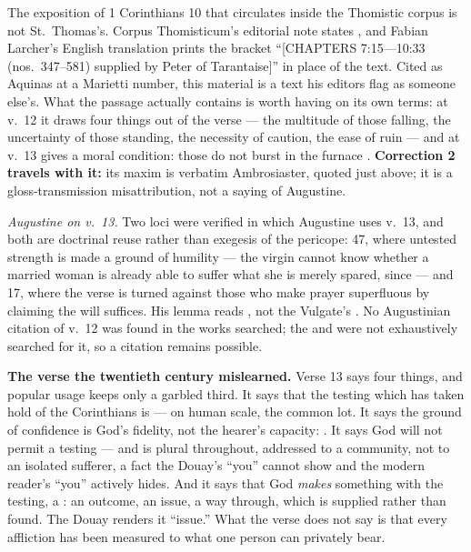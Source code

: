 \begin{witnessnote}
The exposition of 1 Corinthians 10 that circulates inside the Thomistic corpus
is not St.\ Thomas's. Corpus Thomisticum's editorial note states , and Fabian Larcher's English
translation prints the bracket ``[CHAPTERS 7:15---10:33 (nos.\ 347--581)
supplied by Peter of Tarantaise]'' in place of the text. Cited as Aquinas at
a Marietti number, this material is a text his editors flag as someone
else's. What the passage actually contains
is worth having on its own terms: at v.~12 it draws four things out of the
verse --- the multitude of those falling, the uncertainty of those standing,
the necessity of caution, the ease of ruin --- and at v.~13 gives
 a moral condition: those do not burst in the furnace
. \textbf{Correction 2 travels with
it:} its maxim 
is verbatim Ambrosiaster, quoted just above; it is a gloss-transmission
misattribution, not a saying of Augustine.
\end{witnessnote}

\textit{Augustine on v.~13.} Two loci were verified in which
Augustine uses v.~13, and both are doctrinal reuse rather than exegesis of the
pericope:  47, where untested strength is made a
ground of humility --- the virgin cannot know whether a married woman is
already able to suffer what she is merely spared, since  --- and  17, where the
verse is turned against those who make prayer superfluous by claiming the will
suffices. His lemma reads , not the Vulgate's
. No Augustinian citation of v.~12 was found in the works
searched; the  and  were not exhaustively
searched for it, so a citation remains possible.

\textbf{The verse the twentieth century mislearned.} Verse 13 says four
things, and popular usage keeps only a garbled third. It says that the
testing which has taken hold of the Corinthians is  --- on
human scale, the common lot. It says the ground of confidence is God's
fidelity, not the hearer's capacity: . It says
God will not permit a testing  --- and
 is plural throughout, addressed to a community, not to an
isolated sufferer, a fact the Douay's ``you'' cannot show and the modern
reader's ``you'' actively hides. And it says that God \textit{makes} something
with the testing, a : an outcome, an issue, a way through,
which is supplied rather than found. The Douay renders it ``issue.'' What the
verse does not say is that every affliction has been measured to what one
person can privately bear.

